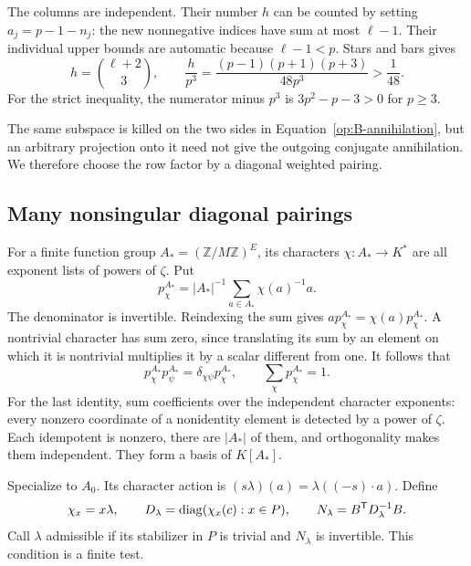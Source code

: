 The columns are independent. Their number $h$ can be counted by setting
$a_j=p-1-n_j$: the new nonnegative indices have sum at most $\ell-1$.
Their individual upper bounds are automatic because $\ell-1<p$.
Stars and bars gives
\begin{equation}\label{op:h}
 h=\binom{\ell+2}{3},\qquad
 \frac{h}{p^3}=\frac{(p-1)(p+1)(p+3)}{48p^3}>\frac1{48}.
\end{equation}
For the strict inequality, the numerator minus $p^3$ is
$3p^2-p-3>0$ for $p\ge3$.

The same subspace is killed on the two sides in
Equation~\eqref{op:B-annihilation}, but an arbitrary projection onto it
need not give the outgoing conjugate annihilation. We therefore choose
the row factor by a diagonal weighted pairing.

\subsection{Many nonsingular diagonal pairings}

For a finite function group $A_*=(\mathbb Z/M\mathbb Z)^E$, its
characters $\chi:A_*\to K^*$ are all exponent lists of powers of
$\zeta$. Put
\begin{equation}\label{op:fourier}
 p_\chi^{A_*}=|A_*|^{-1}\sum_{a\in A_*}\chi(a)^{-1}a.
\end{equation}
The denominator is invertible. Reindexing the sum gives
$a p_\chi^{A_*}=\chi(a)p_\chi^{A_*}$. A nontrivial character has sum
zero, since translating its sum by an element on which it is nontrivial
multiplies it by a scalar different from one. It follows that
\[
 p_\chi^{A_*}p_\psi^{A_*}=\delta_{\chi\psi}p_\chi^{A_*},\qquad
 \sum_\chi p_\chi^{A_*}=1.
\]
For the last identity, sum coefficients over the independent character
exponents: every nonzero coordinate of a nonidentity element is detected
by a power of $\zeta$. Each idempotent is nonzero, there are $|A_*|$ of
them, and orthogonality makes them independent. They form a basis of
$K[A_*]$.

Specialize to $A_0$. Its character action is
$(s\lambda)(a)=\lambda((-s)\cdot a)$. Define
\[
 \chi_x=x\lambda,\qquad
 D_\lambda=\operatorname{diag}(\chi_x(c):x\in P),\qquad
 N_\lambda=B^{\mathsf T}D_\lambda^{-1}B.
\]
Call $\lambda$ admissible if its stabilizer in $P$ is trivial and
$N_\lambda$ is invertible. This condition is a finite test.


